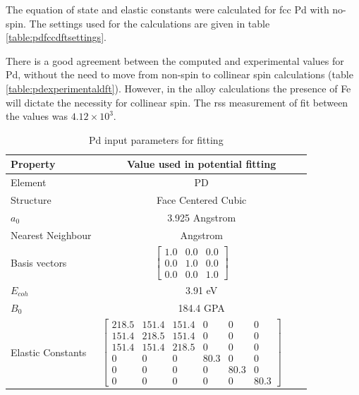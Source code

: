 The equation of state and elastic constants were calculated for \acrshort{fcc} Pd with no-spin.  The settings used for the calculations are given in table \ref{table:pdfccdftsettings}. 

There is a good agreement between the computed and experimental values for Pd, without the need to move from non-spin to collinear spin calculations (table \ref{table:pdexperimentaldft}).  However, in the alloy calculations the  presence of Fe will dictate the necessity for collinear spin.  The \acrshort{rss} measurement of fit between the values was $4.12 \times 10^3$.

\begin{table}[ht]
\renewcommand{\arraystretch}{1.2}
\begin{tabular}{lccc}
\hline\hline
Property & \multicolumn{3}{c}{Value used in potential fitting} \\
\hline\hline
Element & \multicolumn{3}{c}{PD}\\
Structure             & \multicolumn{3}{c}{Face Centered Cubic}\\
$a_0$                 & \multicolumn{3}{c}{3.925 Angstrom \cite{webelementspd}}\\
Nearest Neighbour     & \multicolumn{3}{c}{ Angstrom \cite{webelementspd}}\\
Basis vectors         & $\begin{bmatrix} 1.0 & 0.0 & 0.0 \\ 0.0 & 1.0 & 0.0 \\ 0.0 & 0.0 & 1.0  \end{bmatrix}$ \\
$E_{coh}$             & \multicolumn{3}{c}{3.91 eV \cite{semiempiricalpots}}   \\
$B_0$                 & \multicolumn{3}{c}{184.4 GPA \cite{semiempiricalpots}}   \\
Elastic Constants     & $\begin{bmatrix} 218.5 & 151.4 & 151.4 & 0 & 0 & 0 \\ 151.4 & 218.5 & 151.4 & 0 & 0 & 0 \\ 151.4 & 151.4 & 218.5 & 0 & 0 & 0 \\ 0 & 0 & 0 & 80.3 & 0 & 0 \\ 0 & 0 & 0 & 0 & 80.3 & 0 \\ 0 & 0 & 0 & 0 & 0 & 80.3 \end{bmatrix}$ \\
\hline\hline
\end{tabular}
\caption{Pd input parameters for fitting}
\label{table:pdinputparameters}
\end{table}





